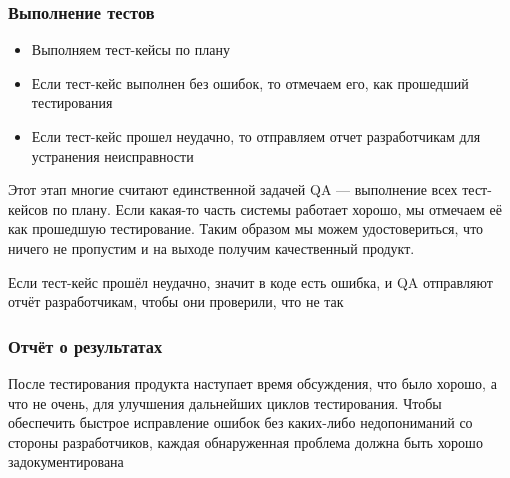 \documentclass{../industrial-development}
\begin{document}
	\begin{frame} \frametitle{Выполнение тестов}
		\begin{itemize}
			\item Выполняем тест-кейсы по плану
			\item Если тест-кейс выполнен без ошибок, то отмечаем его, как прошедший тестирования
			\item Если тест-кейс прошел неудачно, то отправляем отчет разработчикам для устранения неисправности
		\end{itemize}
	\end{frame}
	\lecturenotes Этот этап многие считают единственной задачей QA --- выполнение всех тест-кейсов по плану. Если какая-то часть системы работает хорошо, мы отмечаем её как прошедшую тестирование. Таким образом мы можем удостовериться, что ничего не пропустим и на выходе получим качественный продукт.
	
	Если тест-кейс прошёл неудачно, значит в коде есть ошибка, и QA отправляют отчёт разработчикам, чтобы они проверили, что не так
	
	
	\begin{frame} \frametitle{Отчёт о результатах}
	После тестирования продукта наступает время обсуждения, что было хорошо, а что не очень, для улучшения дальнейших циклов тестирования. Чтобы обеспечить быстрое исправление ошибок без каких-либо недопониманий со стороны разработчиков, каждая обнаруженная проблема должна быть хорошо задокументирована
	\end{frame}
\end{document}
